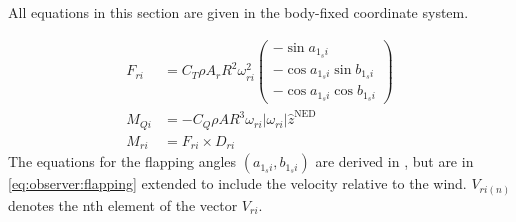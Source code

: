     All equations in this section are given in the body-fixed coordinate system.

    \begin{subequations}
        \begin{align}
            F_{ri} &= C_{T} \rho A_{r} R^{2} \omega_{ri}^{2}\left(
                \begin{array}{c}
                    -\sin{a_{1_{s}i}} \\
                    -\cos{a_{1_{s}i}}\sin{b_{1_{s}i}} \\
                    -\cos{a_{1_{s}i}}\cos{b_{1_{s}i}}
                \end{array}\right)
                \label{eq:observer:thrust} \\
%
            M_{Qi} &= -C_{Q} \rho A R^{3} \omega_{ri}|\omega_{ri}|\hat{z}^{\text{NED}} \label{eq:observer:torque} \\
%
            M_{ri} &= F_{ri} \times D_{ri} \label{eq:observer:thrustmomentum}
        \end{align}
    \end{subequations}
    The equations for the flapping angles $\left(a_{1_{s}i}, b_{1_{s}i}\right)$ are
    derived in \citep{Pounds_modellingand,prouty1995helicopter,leishman2002principles},
    but are in \eqref{eq:observer:flapping} extended to include the velocity relative to the wind.
    $V_{ri(n)}$ denotes the nth element of the vector $V_{ri}$.
